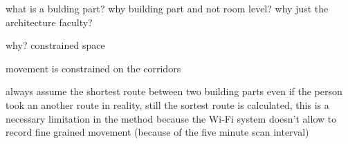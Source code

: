   what is a bulding part? why building part and not room level? why just
the architecture faculty?

why?
constrained space

movement is constrained on the corridors

always assume the shortest route between two building parts
even if the person took an another route in reality, still the sortest route is
calculated, this is a necessary limitation in the method because the Wi-Fi
system doesn't allow to record fine grained movement (because of the five
minute scan interval)



